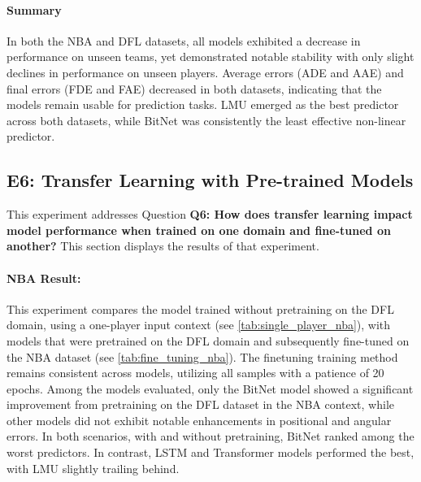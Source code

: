 \paragraph {Summary}
In both the NBA and DFL datasets, all models exhibited a decrease in performance on unseen teams, yet demonstrated notable stability with only slight declines in performance on unseen players. Average errors (ADE and AAE) and final errors (FDE and FAE) decreased in both datasets, indicating that the models remain usable for prediction tasks. LMU emerged as the best predictor across both datasets, while BitNet was consistently the least effective non-linear predictor.

\FloatBarrier
\subsection{E6: Transfer Learning with Pre-trained Models}
This experiment addresses Question \textbf{Q6: How does transfer learning impact model performance when trained on one domain and fine-tuned on another?} This section displays the results of that experiment.

\label{exp:transf}
\paragraph {NBA Result:}

This experiment compares the model trained without pretraining on the DFL domain, using a one-player input context (see \ref{tab:single_player_nba}), with models that were pretrained on the DFL domain and subsequently fine-tuned on the NBA dataset (see \ref{tab:fine_tuning_nba}). The finetuning training method remains consistent across models, utilizing all samples with a patience of 20 epochs. Among the models evaluated, only the BitNet model showed a significant improvement from pretraining on the DFL dataset in the NBA context, while other models did not exhibit notable enhancements in positional and angular errors. In both scenarios, with and without pretraining, BitNet ranked among the worst predictors. In contrast, LSTM and Transformer models performed the best, with LMU slightly trailing behind.


